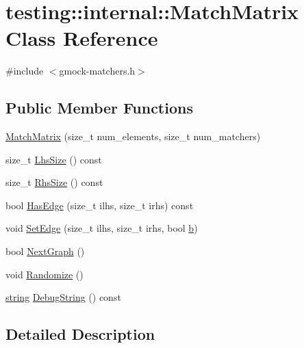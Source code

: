 \hypertarget{classtesting_1_1internal_1_1_match_matrix}{}\section{testing\+:\+:internal\+:\+:Match\+Matrix Class Reference}
\label{classtesting_1_1internal_1_1_match_matrix}


{\ttfamily \#include $<$gmock-\/matchers.\+h$>$}

\subsection*{Public Member Functions}
\begin{DoxyCompactItemize}
\item 
\hyperlink{classtesting_1_1internal_1_1_match_matrix_afa3313976a69b2a954b2f8b8840c37bb}{Match\+Matrix} (size\+\_\+t num\+\_\+elements, size\+\_\+t num\+\_\+matchers)
\item 
size\+\_\+t \hyperlink{classtesting_1_1internal_1_1_match_matrix_ab98f3aa7fd9a536329e495a5016f8d63}{Lhs\+Size} () const 
\item 
size\+\_\+t \hyperlink{classtesting_1_1internal_1_1_match_matrix_a5292e007b3d54e2d89e38fa2a9c4e9d9}{Rhs\+Size} () const 
\item 
bool \hyperlink{classtesting_1_1internal_1_1_match_matrix_a57dc17758dbb54baed8e7294df8f16fc}{Has\+Edge} (size\+\_\+t ilhs, size\+\_\+t irhs) const 
\item 
void \hyperlink{classtesting_1_1internal_1_1_match_matrix_aac7e9c6e0e4b51e6b1334829a0781021}{Set\+Edge} (size\+\_\+t ilhs, size\+\_\+t irhs, bool \hyperlink{jquery_8js_a2fa551895933fae935a0a6b87282241d}{b})
\item 
bool \hyperlink{classtesting_1_1internal_1_1_match_matrix_a3a35e2d6107c225537d7e776465a7893}{Next\+Graph} ()
\item 
void \hyperlink{classtesting_1_1internal_1_1_match_matrix_aff1f0ae748f4a5c96117c0f27b493ac6}{Randomize} ()
\item 
\hyperlink{namespacetesting_1_1internal_a8e8ff5b11e64078831112677156cb111}{string} \hyperlink{classtesting_1_1internal_1_1_match_matrix_a0bfd9e3494fe211c9147aea6867ae7c4}{Debug\+String} () const 
\end{DoxyCompactItemize}


\subsection{Detailed Description}


